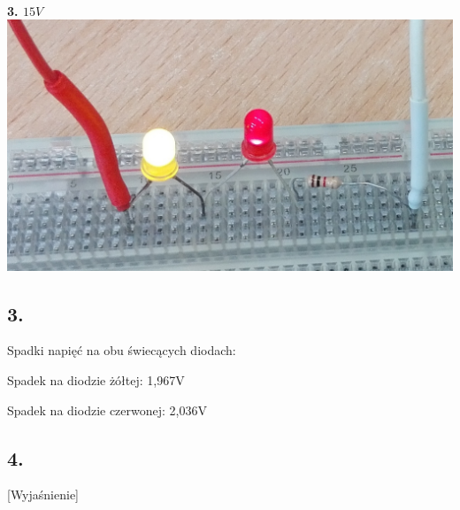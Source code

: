 \documentclass[polish,a4paper]{article}
\begin{document}
\\
\textbf{3. $15V$}\\
\includegraphics[width=\textwidth]{15V}



\subsection*{3.} Spadki napięć na obu świecących diodach:
\newline

Spadek na diodzie żółtej: 1,967V
\newline

Spadek na diodzie czerwonej: 2,036V
\newline


\subsection*{4.} [Wyjaśnienie]
\end{document}
